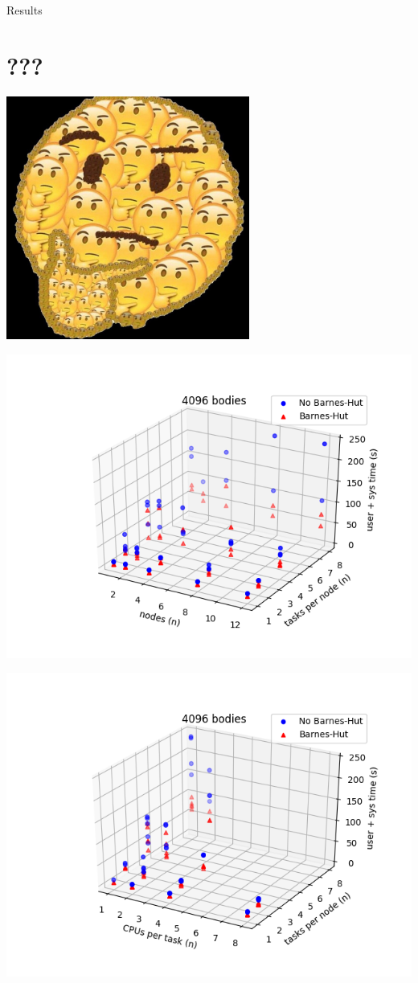 \documentclass{beamer}
\begin{document}
\begin{frame}[allowframebreaks]{Results}
\section{???}

\includegraphics[width=8cm]{hmm}

\framebreak

\includegraphics[width=\linewidth]{4096-nodes-tasksPerNode}

\framebreak

\includegraphics[width=\linewidth]{4096-cpusPerTask-tasksPerNode}


\end{frame}
\end{document}
